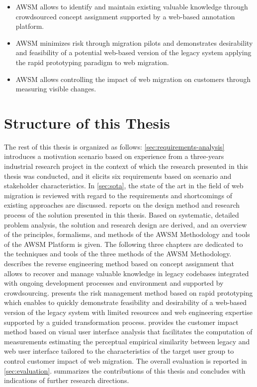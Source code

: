 \begin{itemize}
\tightlist
\item
  AWSM allows to identify and maintain existing valuable knowledge through crowdsourced concept assignment supported by a web-based annotation platform.
\item
  AWSM minimizes risk through migration pilots and demonstrates desirability and feasibility of a potential web-based version of the legacy system applying the rapid prototyping paradigm to web migration.
\item
  AWSM allows controlling the impact of web migration on customers through measuring visible changes.
\end{itemize}

\hypertarget{structure-of-this-thesis}{%
\section{Structure of this Thesis}\label{structure-of-this-thesis}}

The rest of this thesis is organized as follows: \cref{sec:requirements-analysis} introduces a motivation scenario based on experience from a three-years industrial research project in the context of which the research presented in this thesis was conducted, and it elicits six requirements based on scenario and stakeholder characteristics.
In \cref{sec:sota}, the state of the art in the field of web migration is reviewed with regard to the requirements and shortcomings of existing approaches are discussed.
 reports on the design method and research process of the solution presented in this thesis.
Based on systematic, detailed problem analysis, the solution and research design are derived, and an overview of the principles, formalisms, and methods of the AWSM Methodology and tools of the AWSM Platform is given.
The following three chapters are dedicated to the techniques and tools of the three methods of the AWSM Methodology.
 describes the reverse engineering method based on concept assignment that allows to recover and manage valuable knowledge in legacy codebases integrated with ongoing development processes and environment and supported by crowdsourcing.
 presents the risk management method based on rapid prototyping which enables to quickly demonstrate feasibility and desirability of a web-based version of the legacy system with limited resources and web engineering expertise supported by a guided transformation process.
 provides the customer impact method based on visual user interface analysis that facilitates the computation of measurements estimating the perceptual empirical similarity between legacy and web user interface tailored to the characteristics of the target user group to control customer impact of web migration.
The overall evaluation is reported in \cref{sec:evaluation}.
 summarizes the contributions of this thesis and concludes with indications of further research directions.

